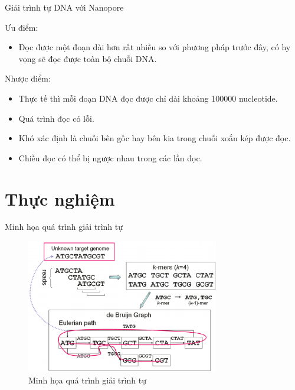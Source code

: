 \documentclass[10pt]{beamer}
\theoremstyle{remark}
\numberwithin{algocf}{section}
\numberwithin{equation}{section}
\numberwithin{dl}{section}
\numberwithin{figure}{section}
\begin{document}
\begin{frame}{Giải trình tự DNA với Nanopore}

    Ưu điểm:

    \begin{itemize}
        \item Đọc được một đoạn dài hơn rất nhiều so với phương pháp trước đây, có hy vọng sẽ đọc được toàn bộ chuỗi DNA.
    \end{itemize}

    Nhược điểm:

    \begin{itemize}
        \item Thực tế thì mỗi đoạn DNA đọc được chỉ dài khoảng 100000 nucleotide.
        \item Quá trình đọc có lỗi.
        \item Khó xác định là chuỗi bên gốc hay bên kia trong chuỗi xoắn kép được đọc.
        \item Chiều đọc có thể bị ngược nhau trong các lần đọc.
    \end{itemize}
    
\end{frame}

\section{Thực nghiệm}

\begin{frame}{Minh họa quá trình giải trình tự}
    \begin{figure}[h!]
        \centering
        \includegraphics[width=0.75\textwidth]{Illustration-of-de-Bruijn-graph-based-assembly.png}
        \caption{Minh họa quá trình giải trình tự}
    \end{figure}
\end{frame}
\end{document}

